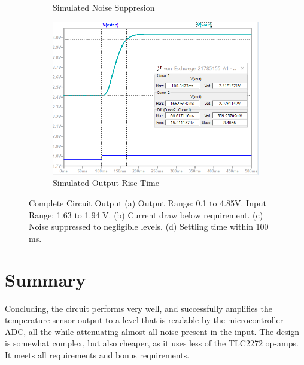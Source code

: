 \begin{figure}[h]
\begin{subfigure}[]{0.45\textwidth}
		    \caption{Simulated Noise Suppresion} \label{subfig:noise}
     \end{subfigure}
    \begin{subfigure}[]{0.45\textwidth}
              \centering
  		\includegraphics[width=1\linewidth]{./Figures/ts}
		    \caption{Simulated Output Rise Time} \label{subfig:ts}
     \end{subfigure}
   \caption[\textcolor{red}{Complete Circuit Output}]{Complete Circuit Output (a) Output Range: 0.1 to 4.85V. Input Range: 1.63 to 1.94 V. (b)  Current draw below requirement.  (c)  Noise suppressed to negligible levels. (d) Settling time within 100 ms.}
    \label{fig:simulation_results_box}
 \end{figure}

\section{Summary}\label{sec:temp_summary}
Concluding, the circuit performs very well, and successfully amplifies the temperature sensor output to a level that is readable by the microcontroller ADC, all the while attenuating almost all noise present in the input. The design is somewhat complex, but also cheaper, as it uses less of the TLC2272 op-amps. It meets all requirements and bonus requirements.


